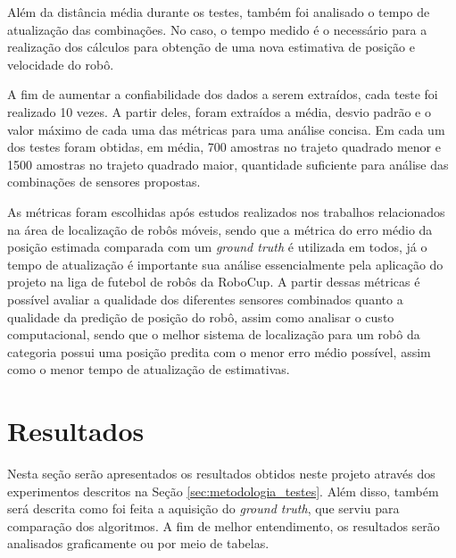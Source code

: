 \documentclass[acronym, symbols, table, deposito]{fei}
\begin{document}
		Além da distância média durante os testes, também foi analisado o tempo de atualização das combinações. No caso, o tempo medido é o necessário para a realização dos cálculos para obtenção de uma nova estimativa de posição e velocidade do robô.
		
		
		A fim de aumentar a confiabilidade dos dados a serem extraídos, cada teste foi realizado 10 vezes. A partir deles, foram extraídos a média, desvio padrão e o valor máximo de cada uma das métricas para uma análise concisa. Em cada um dos testes foram obtidas, em média, 700 amostras no trajeto quadrado menor e 1500 amostras no trajeto quadrado maior, quantidade suficiente para análise das combinações de sensores propostas.
		
		As métricas foram escolhidas após estudos realizados nos trabalhos relacionados na área de localização de robôs móveis, sendo que a métrica do erro médio da posição estimada comparada com um \textit{ground truth} é utilizada em todos, já o tempo de atualização é importante sua análise essencialmente pela aplicação do projeto na liga de futebol de robôs  da RoboCup. A partir dessas métricas é possível avaliar a qualidade dos diferentes sensores combinados quanto a qualidade da predição de posição do robô, assim como analisar o custo computacional, sendo que o melhor sistema de localização para um robô da categoria  possui uma posição predita com o menor erro médio possível, assim como o menor tempo de atualização de estimativas.
		
	\chapter{Resultados} \label{sec:resultados}
	
		Nesta seção serão apresentados os resultados obtidos neste projeto através dos experimentos descritos na Seção \ref{sec:metodologia_testes}. Além disso, também será descrita como foi feita a aquisição do \textit{ground truth}, que serviu para comparação dos algoritmos. A fim de melhor entendimento, os resultados serão analisados graficamente ou por meio de tabelas.
		
\end{document}
